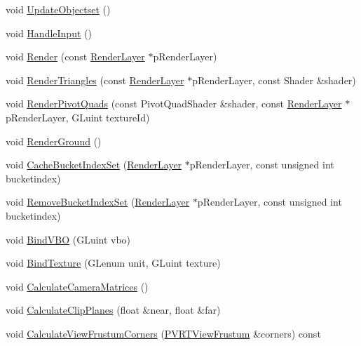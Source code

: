 \begin{DoxyCompactItemize}
\item 
void \hyperlink{class_o_g_l_e_s2_navigation_ae0899c5e552106cb98f5610b1ffa92c0}{Update\+Objectset} ()
\item 
void \hyperlink{class_o_g_l_e_s2_navigation_ac6f36ca1beb9575ccb9ab9d462ee282a}{Handle\+Input} ()
\item 
void \hyperlink{class_o_g_l_e_s2_navigation_adc747ca2cc27c2375ba8b637a325c1de}{Render} (const \hyperlink{struct_render_layer}{Render\+Layer} $\ast$p\+Render\+Layer)
\item 
void \hyperlink{class_o_g_l_e_s2_navigation_a376d794ed52e5a1ac95edce69babdbdf}{Render\+Triangles} (const \hyperlink{struct_render_layer}{Render\+Layer} $\ast$p\+Render\+Layer, const Shader \&shader)
\item 
void \hyperlink{class_o_g_l_e_s2_navigation_a34c7d1c4b05ac705b82eb056c0ab29c0}{Render\+Pivot\+Quads} (const Pivot\+Quad\+Shader \&shader, const \hyperlink{struct_render_layer}{Render\+Layer} $\ast$p\+Render\+Layer, G\+Luint texture\+Id)
\item 
void \hyperlink{class_o_g_l_e_s2_navigation_ae4e5f1c2c5c9efa63a3929f64cc9f07a}{Render\+Ground} ()
\item 
void \hyperlink{class_o_g_l_e_s2_navigation_a88406e7849c1a2f858a3941f55a2d6cb}{Cache\+Bucket\+Index\+Set} (\hyperlink{struct_render_layer}{Render\+Layer} $\ast$p\+Render\+Layer, const unsigned int bucketindex)
\item 
void \hyperlink{class_o_g_l_e_s2_navigation_af780f6d33fe9bb85391488abc145d6dc}{Remove\+Bucket\+Index\+Set} (\hyperlink{struct_render_layer}{Render\+Layer} $\ast$p\+Render\+Layer, const unsigned int bucketindex)
\item 
void \hyperlink{class_o_g_l_e_s2_navigation_ae37e75ddeb25b70d6191c5765ad43fc7}{Bind\+V\+B\+O} (G\+Luint vbo)
\item 
void \hyperlink{class_o_g_l_e_s2_navigation_aa6a2a359eb8d55dc77157088c093595f}{Bind\+Texture} (G\+Lenum unit, G\+Luint texture)
\item 
void \hyperlink{class_o_g_l_e_s2_navigation_a3e081f47fc116f70506aba5496d5ac5a}{Calculate\+Camera\+Matrices} ()
\item 
void \hyperlink{class_o_g_l_e_s2_navigation_a1283438fa555e0329f85b6518741a032}{Calculate\+Clip\+Planes} (float \&near, float \&far)
\item 
void \hyperlink{class_o_g_l_e_s2_navigation_af44f4e538002db7e9caeb4f64f5053e3}{Calculate\+View\+Frustum\+Corners} (\hyperlink{struct_p_v_r_t_view_frustum}{P\+V\+R\+T\+View\+Frustum} \&corners) const 

\end{DoxyCompactItemize}
